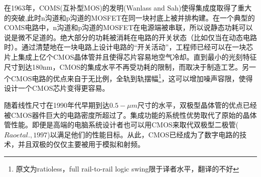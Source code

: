 \documentclass[cn,11pt,chinese]{elegantbook}
\begin{document}
在1963年，COMS(互补型MOS)的发明(Wanlass and Sah)使得集成度取得了重大的突破,此时n沟道和p沟道的MOSFET在同一块衬底上被并排构建。在一个典型的COMS电路中，n沟道和p沟道的MOSFET在电源端被串联，所以说静态功耗可以说是微不足道的。绝大部分的功耗被消耗在电路的开关状态（比如仅当在动态电路时）。通过清楚地在一块电路上设计电路的“开关活动”，工程师已经可以在一块芯片上集成上亿个CMOS晶体管并且使得芯片容易地空气冷却。直到最小的光刻特征尺寸到达180nm，CMOS的集成水平不再受功耗的限制，而取决于制造工艺。另一个CMOS电路的优点来自于无比例，全轨到轨摆幅\footnote{原文为ratioless，full rail-to-rail logic swing限于译者水平，翻译的不好}，这可以增加噪声容限，使得设计一个CMOS芯片变得更容易。


随着线性尺寸在1990年代早期到达$0.5-\mu m$尺寸的水平，双极型晶体管的优点已经被CMOS器件巨大的电路密度所超过了。集成功能的系统性优势取代了原始的晶体管性能。即便是高端的电脑系统设计者也可以用CMOS来取代双极型二极管($Rao et al.,1997$)以满足他们的性能目标。从此，CMOS已经成为了数字电路的技术，并且双极的仅仅主要被用于模拟和射频。
\end{document}
